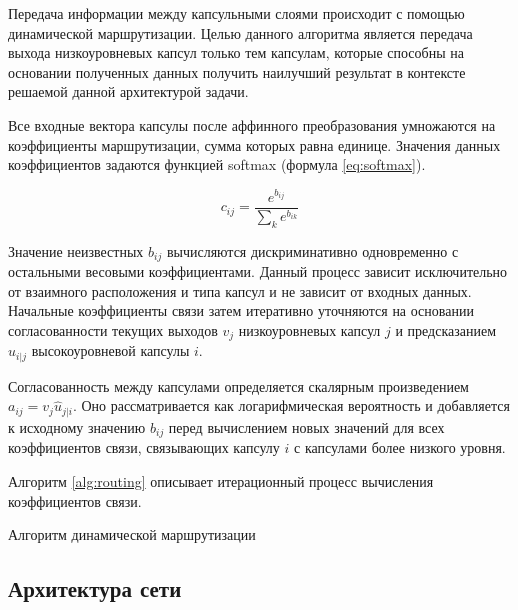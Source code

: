 Передача информации между капсульными слоями происходит с помощью динамической маршрутизации. Целью данного алгоритма является передача выхода низкоуровневых капсул только тем капсулам, которые способны на основании полученных данных получить наилучший результат в контексте решаемой данной архитектурой задачи. 

Все входные вектора капсулы после аффинного преобразования умножаются на коэффициенты маршрутизации, сумма которых равна единице. Значения данных коэффициентов задаются функцией softmax (формула \ref{eq:softmax}).

\begin{equation}\label{eq:softmax}
c_{ij} = \frac{e^{b_{ij}}}{\sum_{k}e^{b_{ik}}}
\end{equation}

Значение неизвестных $b_{ij}$ вычисляются дискриминативно одновременно с остальными весовыми коэффициентами. Данный процесс зависит исключительно от взаимного расположения и типа капсул и не зависит от входных данных. Начальные коэффициенты связи затем итеративно уточняются на основании согласованности текущих выходов $v_j$ низкоуровневых капсул $j$ и предсказанием $\hat{u}_{i|j}$ высокоуровневой капсулы $i$.

Согласованность между капсулами определяется скалярным произведением $a_{ij} = v_j \hat{u}_{j|i}$. Оно рассматривается как логарифмическая вероятность и добавляется к исходному значению $b_{ij}$  перед вычислением новых значений для всех коэффициентов связи, связывающих капсулу $i$ с капсулами более низкого уровня.

Алгоритм \ref{alg:routing} описывает итерационный процесс вычисления коэффициентов связи.

\begin{algorithm}[H]
	\label{alg:routing}
	\SetAlgoLined
	\caption{Алгоритм динамической маршрутизации}
\end{algorithm}


\subsection{Архитектура сети}

